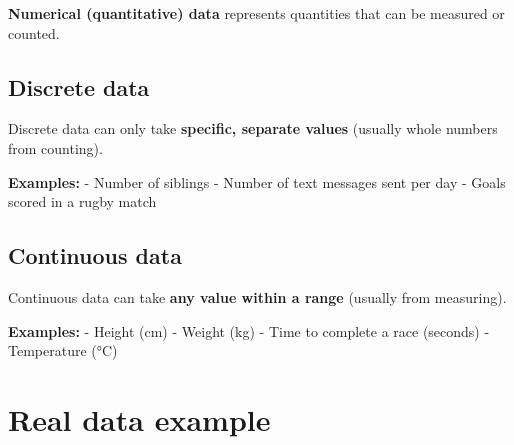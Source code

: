 \documentclass[
  11pt,
  a4paper,
  oneside,
  open=any]{scrbook}
\begin{document}
\textbf{Numerical (quantitative) data} represents quantities that can be
measured or counted.

\subsection{Discrete data}\label{discrete-data}

Discrete data can only take \textbf{specific, separate values} (usually
whole numbers from counting).

\textbf{Examples:} - Number of siblings - Number of text messages sent
per day - Goals scored in a rugby match

\subsection{Continuous data}\label{continuous-data}

Continuous data can take \textbf{any value within a range} (usually from
measuring).

\textbf{Examples:} - Height (cm) - Weight (kg) - Time to complete a race
(seconds) - Temperature (°C)

\section{Real data example}\label{real-data-example}
\end{document}

